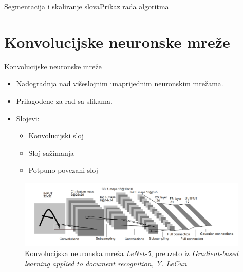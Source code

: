 \documentclass{beamer}
\begin{document}
\begin{frame}{Segmentacija i skaliranje slova}{Prikaz rada algoritma}

\begin{figure}
\centering
{}
\end{figure} 

\end{frame}


\section{Konvolucijske neuronske mreže}
\begin{frame}{Konvolucijske neuronske mreže}
\begin{itemize}
  \item {
    Nadogradnja nad višeslojnim unaprijednim neuronskim mrežama.
    \pause
  }
  \item {
    Prilagođene za rad sa slikama.
    \pause
  }
    \item {
    Slojevi:
    \begin{itemize}
        \item Konvolucijski sloj
        \item Sloj sažimanja
        \item Potpuno povezani sloj
    \end{itemize}
    \pause
  }
  \end{itemize}
  \begin{figure}[htb]
    \centering
    \includegraphics[width=11cm]{lenet-5.png}
    \caption{Konvolucijska neuronska mreža \emph{LeNet-5}, preuzeto iz \emph{Gradient-based learning applied to document recognition, Y. LeCun}}
    \label{fig:lenet5}
    \end{figure}
\end{frame}
\end{document}
